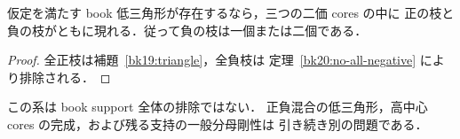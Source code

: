 \begin{corollary}
\label{bk20:mixed-necessary}
仮定を満たす book 低三角形が存在するなら，三つの二価 cores の中に
正の枝と負の枝がともに現れる．従って負の枝は一個または二個である．
\end{corollary}

\begin{proof}
全正枝は補題~\ref{bk19:triangle}，全負枝は
定理~\ref{bk20:no-all-negative} により排除される．
\end{proof}

この系は book support 全体の排除ではない．
正負混合の低三角形，高中心 cores の完成，および残る支持の一般分母剛性は
引き続き別の問題である．
